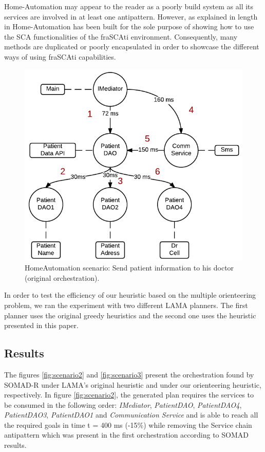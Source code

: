 \documentclass[lnbip]{svmultln}
\begin{document}
Home-Automation may appear to the reader as a poorly build system as all its services are involved in at least one antipattern. However, as explained in length in \cite{ Palma, Nayrolles2013a} Home-Automation has been built for the sole purpose of showing how to use the SCA functionalities of the fraSCAti environment. Consequently, many methods are duplicated or poorly encapsulated in order to showcase the different ways of using fraSCAti capabilities.

\begin{figure}
    \centering
	\includegraphics[scale=0.35]{scenario1.png}
 	\caption{HomeAutomation scenario: Send patient information to his doctor (original orchestration).}
    \label{fig:scenario1}
\end{figure}

In order to test the efficiency of our heuristic based on the multiple orienteering problem, we ran the experiment with two different LAMA planners. The first planner uses the original greedy heuristics and the second one uses the heuristic presented in this paper. 

\subsection{Results}

The figures \ref{fig:scenario2} and \ref{fig:scenario3} present the orchestration found by SOMAD-R under LAMA's original heuristic and under our orienteering heuristic, respectively.
In figure \ref{fig:scenario2}, the generated plan requires the services to be consumed in the following order: \textit{IMediator}, \textit{PatientDAO}, \textit{PatientDAO4}, \textit{PatientDAO3}, \textit{PatientDAO1} and \textit{Communication Service} and is able to reach all the required goals in time t = 400 ms (-15\%) while removing the Service chain antipattern which was present in the first orchestration according to SOMAD results.
\end{document}
